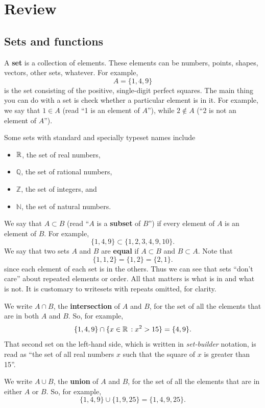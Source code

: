 \documentclass{watsonbook}
\begin{document}
\section{Review} 

\subsection{Sets and functions}  \label{a:setsandfunctions}

A \textbf{set} is a collection of elements. These elements can be
numbers, points, shapes, vectors, other sets, whatever. For example,
\[
  A = \{1,4,9\} 
\]
is the set consisting of the positive, single-digit perfect
squares. The main thing you can do with a set is check whether a
particular element is in it. For example, we say that $1 \in A$ (read
``1 is an element of $A$''), while $2 \notin A$ (``2 is not an element
of $A$'').

Some sets with standard and specially typeset names include 
\begin{itemize} 
\item $\mathbb{R}$, the set of real numbers, 
\item $\mathbb{Q}$, the set of rational numbers, 
\item $\mathbb{Z}$, the set of integers, and 
\item $\mathbb{N}$, the set of natural numbers. 
\end{itemize}

\begin{tcolorbox}[title = Subsets and set equality, parbox = false,
  colframe = MidnightBlue, colback=softblue]
  We say that $A \subset B$ (read ``$A$ is a \textbf{subset} of $B$'')
  if every element of $A$ is an element of $B$. For example,
  \[
    \{1,4,9\} \subset \{1,2,3,4,9,10\}. 
  \]
  We say that two sets $A$ and $B$ are \textbf{equal} if $A\subset B$ and $B\subset A$. Note that 
  \[
    \{1,1,2\} = \{1,2\} = \{2,1\} . 
  \]
  since each element of each set is in the others. Thus we can see that
  sets ``don't care'' about repeated elements or order. All that
matters is what is in and what is not. It is customary to writesets with
  repeats omitted, for clarity.
\end{tcolorbox} \enlargethispage{1cm} 

\begin{tcolorbox}[title = Intersections and unions, parbox = false,
  colframe = MidnightBlue, colback=softblue] 
  We write $A\cap B$, the \textbf{intersection} of $A$ and $B$, for
  the set of all the elements that are in both $A$ and $B$. So, for
  example,
  \[
    \{1,4,9\} \cap \{ x \in \mathbb{R} \,: x^2 > 15 \} = \{4,9\}. 
  \]
  That second set on the left-hand side, which is written in
  \textit{set-builder} notation, is read as ``the set of all real
  numbers $x$ such that the square of $x$ is greater than 15''.

  We write $A\cup B$, the \textbf{union} of $A$ and $B$, for the set
  of all the elements that are in either $A$ or $B$. So, for example,
  \[
    \{1,4,9\} \cup \{1,9,25\} = \{1,4,9,25\}. 
  \]
\end{tcolorbox}
\end{document}

